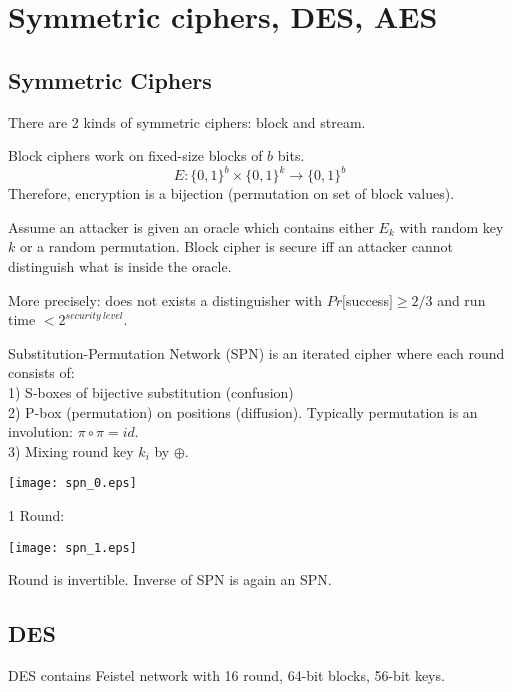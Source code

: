\section{\texorpdfstring{Symmetric ciphers, DES, AES}{Symmetric ciphers, DES, AES}}
\vspace{5mm}
\large

\subsection{Symmetric Ciphers}
There are 2 kinds of symmetric ciphers: block and stream.

\begin{definition}
	Block ciphers work on fixed-size blocks of $b$ bits.
	\[ E:\{0,1\}^b \times \{0,1\}^k \to \{0,1\}^b \]
	Therefore, encryption is a bijection (permutation on set of block values).
\end{definition}

\begin{definition}
	Assume an attacker is given an oracle which contains either $E_k$ with random key $k$ or a random permutation.
	Block cipher is secure iff an attacker cannot distinguish what is inside the oracle.

	More precisely: does not exists a distinguisher with $Pr[$success$] \geq 2/3$ and run time $< 2^{security\ level}$.
\end{definition}

\begin{definition}
	Substitution-Permutation Network (SPN) is an iterated cipher where each round consists of:\\
	1) S-boxes of bijective substitution (confusion)\\
	2) P-box (permutation) on positions (diffusion). Typically permutation is an involution: $\pi \circ \pi = id$.\\
	3) Mixing round key $k_i$ by $\oplus$.

	\texttt{[image: spn\_0.eps]}

	1 Round:

	\texttt{[image: spn\_1.eps]}

	Round is invertible. Inverse of SPN is again an SPN.

\end{definition}

\subsection{DES}
DES contains Feistel network with 16 round, 64-bit blocks, 56-bit keys.


